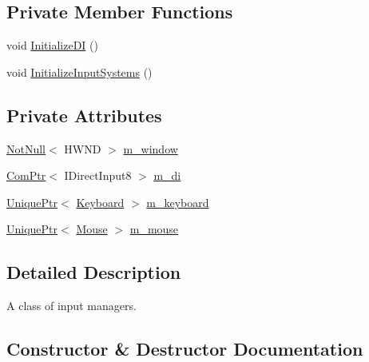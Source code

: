 \subsection*{Private Member Functions}
\begin{DoxyCompactItemize}
\item 
void \hyperlink{classmage_1_1input_1_1_manager_1_1_impl_a407de000dcb4df8fa32a09e246150daf}{Initialize\+DI} ()
\item 
void \hyperlink{classmage_1_1input_1_1_manager_1_1_impl_af97f784f50a39c43ed41abe207a8f61e}{Initialize\+Input\+Systems} ()
\end{DoxyCompactItemize}
\subsection*{Private Attributes}
\begin{DoxyCompactItemize}
\item 
\hyperlink{namespacemage_a8769f9d670d6b585ea306cb1062af94b}{Not\+Null}$<$ H\+W\+ND $>$ \hyperlink{classmage_1_1input_1_1_manager_1_1_impl_afd49b4b35e1c1f93084d5cf31b89fe80}{m\+\_\+window}
\item 
\hyperlink{namespacemage_ae74f374780900893caa5555d1031fd79}{Com\+Ptr}$<$ I\+Direct\+Input8 $>$ \hyperlink{classmage_1_1input_1_1_manager_1_1_impl_afa76fc86c9bc75ac5c00414bc3d03fdb}{m\+\_\+di}
\item 
\hyperlink{namespacemage_a3316d7143a973e37adf1110f2e80ca31}{Unique\+Ptr}$<$ \hyperlink{classmage_1_1input_1_1_keyboard}{Keyboard} $>$ \hyperlink{classmage_1_1input_1_1_manager_1_1_impl_a2b41f999b73742a6c3cb7ba9e86aee9e}{m\+\_\+keyboard}
\item 
\hyperlink{namespacemage_a3316d7143a973e37adf1110f2e80ca31}{Unique\+Ptr}$<$ \hyperlink{classmage_1_1input_1_1_mouse}{Mouse} $>$ \hyperlink{classmage_1_1input_1_1_manager_1_1_impl_aeae8977636864dddcbcdb69ecefca133}{m\+\_\+mouse}
\end{DoxyCompactItemize}


\subsection{Detailed Description}
A class of input managers. 

\subsection{Constructor \& Destructor Documentation}
\hypertarget{classmage_1_1input_1_1_manager_1_1_impl_ac0bc834732b5870792d1b6557e9bbaf7}{}\label{classmage_1_1input_1_1_manager_1_1_impl_ac0bc834732b5870792d1b6557e9bbaf7} 

